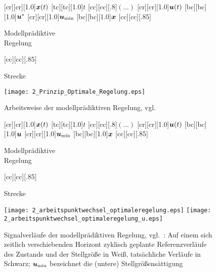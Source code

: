 \begin{figure}[h]
\newcommand{\smallsize}{.85}
	[cr][cr][1.0]{$\boldsymbol{x}(t)$}
	[tc][tc][1.0]{$t$}
	[cc][cc][.8]{$(\ldots)$}
	[cr][cr][1.0]{$\boldsymbol{u}(t)$}
	[bc][bc][1.0]{$\boldsymbol{u}^\ast$}
  [cr][cr][1.0]{$\boldsymbol{u}_{\min}$}
	[bc][bc][1.0]{$\boldsymbol{x}$}
	[cc][cc][\smallsize]{\parbox[c]{7cm}{\begin{center}Modellprädiktive\\ Regelung \end{center}}}
	[cc][cc][\smallsize]{\parbox[c]{7cm}{\begin{center}Strecke \end{center}}}
	\centering
			\texttt{[image: 2\_Prinzip\_Optimale\_Regelung.eps]}
  	\caption[Arbeitsweise der modellprädiktiven Regelung]{Arbeitsweise der modellprädiktiven Regelung, vgl.\ \cite{foellingeroptimal}}
    \label{fig:arbeitspunktwechsel_optimaleregelung_prinzip}
\end{figure}

\begin{figure}[h]
\newcommand{\smallsize}{.85}
	[cr][cr][1.0]{$\boldsymbol{x}(t)$}
	[tc][tc][1.0]{$t$}
	[cc][cc][.8]{$(\ldots)$}
	[cr][cr][1.0]{$\boldsymbol{u}(t)$}
	[bc][bc][1.0]{$\boldsymbol{u}$}
  [cr][cr][1.0]{$\boldsymbol{u}_{\min}$}
	[bc][bc][1.0]{$\boldsymbol{x}$}
	[cc][cc][\smallsize]{\parbox[c]{7cm}{\begin{center}Modellprädiktive\\ Regelung \end{center}}}
	[cc][cc][\smallsize]{\parbox[c]{7cm}{\begin{center}Strecke \end{center}}}
	\centering
  	\texttt{[image: 2\_arbeitspunktwechsel\_optimaleregelung.eps]}
	\hspace{.5cm}
		\texttt{[image: 2\_arbeitspunktwechsel\_optimaleregelung\_u.eps]}
  	\caption[Signalverläufe der modellprädiktiven Regelung]{Signalverläufe der modellprädiktiven Regelung, vgl.\ \cite{graichen2014SkriptOpt}: Auf einem sich zeitlich verschiebenden Horizont zyklisch geplante Referenzverläufe des Zustands und der Stellgröße in Weiß, tatsächliche Verläufe in Schwarz; $\boldsymbol{u}_{\min}$ bezeichnet die (untere) Stellgrößensättigung}
    \label{fig:arbeitspunktwechsel_optimaleregelung}
\end{figure}



